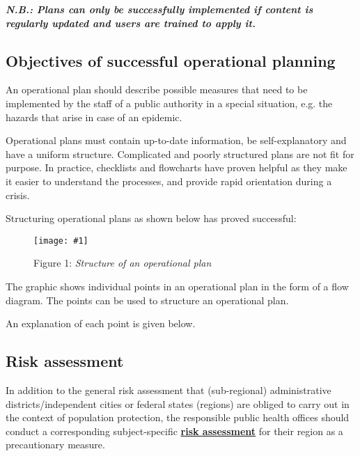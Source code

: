 \documentclass{article}
\newlength{\imgwidth}
\newcommand\scaledgraphics[2]{%
                
\settowidth{\imgwidth}{\texttt{[image: \#1]}}%
                
\setlength{\imgwidth}{\minof{\imgwidth}{#2\textwidth}}%
                
\texttt{[image: \#1]}%
                
}
\begin{document}
\emph{\textbf{N.B.: Plans can only be successfully implemented if content is regularly updated and users are trained to apply it.}}


\subsection{Objectives of successful operational planning}\label{H8776715}



An operational plan should describe possible measures that need to be implemented by the staff of a public authority in a special situation, e.g. the hazards that arise in case of an epidemic.


Operational plans must contain up-to-date information, be self-explanatory and have a uniform structure. Complicated and poorly structured plans are not fit for purpose. In practice, checklists and flowcharts have proven helpful as they make it easier to understand the processes, and provide rapid orientation during a crisis.


Structuring operational plans as shown below has proved successful:

\begin{figure}
\scaledgraphics{4917fd29-2d93-4090-823e-0786d0016fc5.png}{1}
\caption*{Figure 1: \emph{Structure of an operational plan}}\label{F85990681}
\end{figure}





The graphic shows individual points in an operational plan in the form of a flow diagram. The points can be used to structure an operational plan.


An explanation of each point is given below.


\subsection{Risk assessment}\label{H2720057}



In addition to the general risk assessment that (sub-regional) administrative districts/independent cities or federal states (regions) are obliged to carry out in the context of population protection, the responsible public health offices should conduct a corresponding subject-specific \textbf{\href{https://www.bbk.bund.de/SharedDocs/Downloads/BBK/DE/Publikationen/Praxis_Bevoelkerungsschutz/PiB_16_Risikoanalyse_im_Bevoelkerungsschutz.pdf}{risk assessment}} for their region as a precautionary measure.
\end{document}
